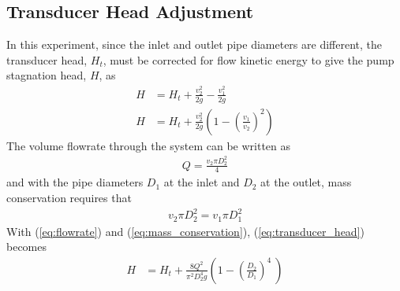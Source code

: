 \subsection{Transducer Head Adjustment}
In this experiment, since the inlet and outlet pipe diameters are different, the transducer head, $H_t$, must be corrected for flow kinetic energy to give the pump stagnation head, $H$, as
\begin{align}
    H &= H_t + \frac{v_2^2}{2g} - \frac{v_1^2}{2g} \nonumber \\
    H &= H_t + \frac{v_2^2}{2g} \left(1 - \left(\frac{v_1}{v_2}\right)^2\right) \label{eq:transducer_head}
\end{align}
The volume flowrate through the system can be written as
\begin{align}
    Q = \frac{v_2 \pi D_2^2}{4} \label{eq:flowrate}
\end{align}
and with the pipe diameters $D_1$ at the inlet and $D_2$ at the outlet, mass conservation requires that
\begin{align}
    v_2 \pi D_2^2 = v_1 \pi D_1^2 \label{eq:mass_conservation}
\end{align}
With (\ref{eq:flowrate}) and (\ref{eq:mass_conservation}), (\ref{eq:transducer_head}) becomes
\begin{align}
    H &= H_t + \frac{8Q^2}{\pi^2 D_2^4 g} \left(1 - \left(\frac{D_2}{D_1}\right)^4\ \right) \label{eq:transducer_head2}
\end{align}